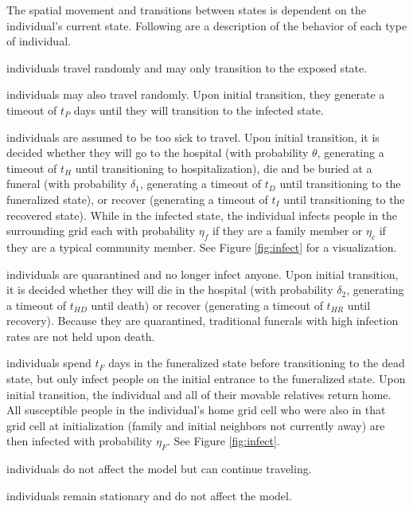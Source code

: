 The spatial movement and transitions between states is dependent on the individual's current state. Following are a description of the behavior of each type of individual.
\begin{description}[labelsep=1.5mm]
\setlength\itemsep{-3mm}
\item[Susceptible] individuals travel randomly and may only transition to the exposed state.\\
\item[Exposed] individuals may also travel randomly. Upon initial transition, they generate a timeout of $t_P$ days until they will transition to the infected state.\\
\item[Infected] individuals are assumed to be too sick to travel. Upon initial transition, it is decided whether they will go to the hospital (with probability $\theta$, generating a timeout of $t_H$ until transitioning to hospitalization), die and be buried at a funeral (with probability $\delta_1$, generating a timeout of $t_D$ until transitioning to the funeralized state), or recover (generating a timeout of $t_I$ until transitioning to the recovered state). While in the infected state, the individual infects people in the surrounding grid each with probability $\eta_f$ if they are a family member or $\eta_c$ if they are a typical community member. See Figure \ref{fig:infect} for a visualization.\\
\item[Hospitalized] individuals are quarantined and no longer infect anyone. Upon initial transition, it is decided whether they will die in the hospital (with probability $\delta_2$, generating a timeout of $t_{HD}$ until death) or recover (generating a timeout of $t_{HR}$ until recovery). Because they are quarantined, traditional funerals with high infection rates are not held upon death.\\
\item[Funeralized] individuals spend $t_F$ days in the funeralized state before transitioning to the dead state, but only infect people on the initial entrance to the funeralized state. Upon initial transition, the individual and all of their movable relatives return home. All susceptible people in the individual's home grid cell who were also in that grid cell at initialization (family and initial neighbors not currently away) are then infected with probability $\eta_F$. See Figure \ref{fig:infect}.\\
\item[Recovered] individuals do not affect the model but can continue traveling.\\
\item[Dead] individuals remain stationary and do not affect the model.\\
\end{description}

